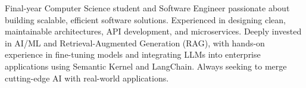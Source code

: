 

\begin{cvparagraph}



 Final-year Computer Science student and Software Engineer passionate about building scalable, efficient software solutions. Experienced in designing clean, maintainable architectures, API development, and microservices. Deeply invested in AI/ML and Retrieval-Augmented Generation (RAG), with hands-on experience in fine-tuning models and integrating LLMs into enterprise applications using Semantic Kernel and LangChain. Always seeking to merge cutting-edge AI with real-world applications.
\end{cvparagraph}
